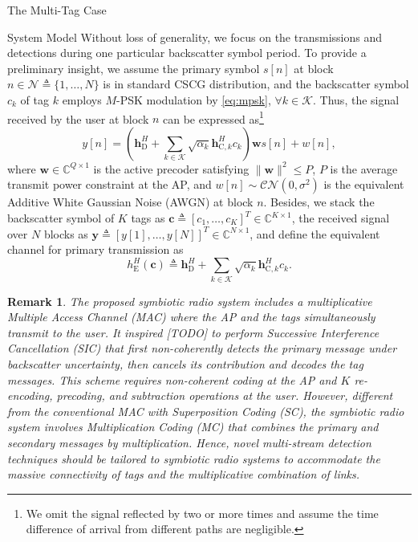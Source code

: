 \documentclass[journal]{IEEEtran}
\newtheorem{remark}{Remark}
\begin{document}
\begin{section}{The Multi-Tag Case}
\begin{subsection}{System Model}
			Without loss of generality, we focus on the transmissions and detections during one particular backscatter symbol period. To provide a preliminary insight, we assume the primary symbol $s[n]$ at block $n \in \mathcal{N} \triangleq \{1,\ldots,N\}$ is in standard CSCG distribution, and the backscatter symbol $c_k$ of tag $k$ employs $M$-PSK modulation by \eqref{eq:mpsk}, $\forall k \in \mathcal{K}$. Thus, the signal received by the user at block $n$ can be expressed as\footnote{We omit the signal reflected by two or more times\cite{Wu2019} and assume the time difference of arrival from different paths are negligible\cite{Guo2019b}.}
			\begin{equation}
				y[n] = \left(\boldsymbol{h}_{\mathrm{D}}^H + \sum_{k \in \mathcal{K}} \sqrt{\alpha_k} \boldsymbol{h}_{\mathrm{C},k}^H c_k\right) \boldsymbol{w} s[n] + w[n],
				\label{eq:received_signal}
			\end{equation}
			where $\boldsymbol{w} \in \mathbb{C}^{Q \times 1}$ is the active precoder satisfying $\lVert \boldsymbol{w} \rVert^2 \le P$, $P$ is the average transmit power constraint at the AP, and $w[n] \sim \mathcal{CN}(0,\sigma^2)$ is the equivalent Additive White Gaussian Noise (AWGN) at block $n$. Besides, we stack the backscatter symbol of $K$ tags as $\boldsymbol{c} \triangleq [c_1,\ldots,c_K]^T \in \mathbb{C}^{K \times 1}$, the received signal over $N$ blocks as $\boldsymbol{y} \triangleq [y[1],\ldots,y[N]]^T \in \mathbb{C}^{N \times 1}$, and define the equivalent channel for primary transmission as
			\begin{equation}
				h_{\mathrm{E}}^H(\boldsymbol{c}) \triangleq \boldsymbol{h}_{\mathrm{D}}^H + \sum_{k \in \mathcal{K}} \sqrt{\alpha_k} \boldsymbol{h}_{\mathrm{C},k}^H c_k.
				\label{eq:equivalent_channel}
			\end{equation}

			\begin{remark}
				The proposed symbiotic radio system includes a multiplicative Multiple Access Channel (MAC) where the AP and the tags simultaneously transmit to the user. It inspired [TODO] to perform Successive Interference Cancellation (SIC) that first non-coherently detects the primary message under backscatter uncertainty, then cancels its contribution and decodes the tag messages. This scheme requires non-coherent coding at the AP and $K$ re-encoding, precoding, and subtraction operations at the user. However, different from the conventional MAC with Superposition Coding (SC), the symbiotic radio system involves Multiplication Coding (MC) that combines the primary and secondary messages by multiplication. Hence, novel multi-stream detection techniques should be tailored to symbiotic radio systems to accommodate the massive connectivity of tags and the multiplicative combination of links.
			\end{remark}
		\end{subsection}


\end{section}
\end{document}
